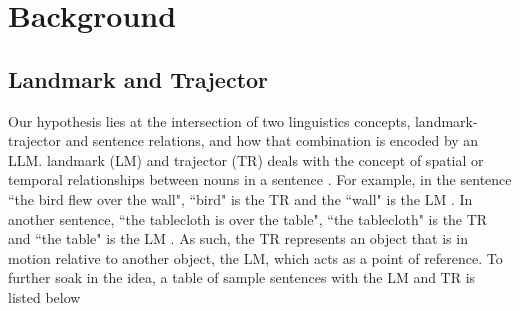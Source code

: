 \documentclass[12pt,letterpaper]{article}
\begin{document}
 



\section{Background}



\subsection{Landmark and Trajector}
Our hypothesis lies at the intersection of two linguistics concepts, landmark-trajector and sentence relations, and how that combination is encoded by an LLM. 
landmark (LM) and trajector (TR) deals with the concept of spatial or temporal relationships between nouns in a sentence \citep{evans_green_cogling_2006}.
For example, in the sentence ``the bird flew over the wall", ``bird" is the TR and the ``wall" is the LM  \citep[p.~335]{evans_green_cogling_2006}. In another sentence, ``the tablecloth is over the table", ``the tablecloth" is the TR and ``the table" is the LM  \citep[pp.~333--348]{evans_green_cogling_2006}. As such, the TR represents an object that is in motion relative to another object, the LM, which acts as a point of reference. To further soak in the idea, a table of sample sentences with the LM and TR is listed below

\end{document}
